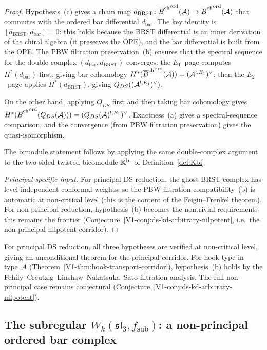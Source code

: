 \begin{proof}
Hypothesis~(c) gives a chain map
$d_{\mathrm{BRST}}\colon {\overline{B}^{\mathrm{ch}}}^{\mathrm{ord}}(\mathcal{A})
\to {\overline{B}^{\mathrm{ch}}}^{\mathrm{ord}}(\mathcal{A})$
that commutes with the ordered bar differential $d_{\mathrm{bar}}$.
The key identity is
$[d_{\mathrm{BRST}}, d_{\mathrm{bar}}] = 0$:
this holds because the BRST differential is an inner derivation of
the chiral algebra (it preserves the OPE), and the bar differential
is built from the OPE. The PBW filtration preservation~(b) ensures
that the spectral sequence for the double complex
$(d_{\mathrm{bar}}, d_{\mathrm{BRST}})$ converges: the $E_1$~page
computes $H^*(d_{\mathrm{bar}})$ first, giving bar cohomology
$H^*({\overline{B}^{\mathrm{ch}}}^{\mathrm{ord}}(\mathcal{A})) = (\mathcal{A}^{!,E_1})^\vee$; then the
$E_2$~page applies $H^*(d_{\mathrm{BRST}})$, giving
$Q_{DS}((\mathcal{A}^{!,E_1})^\vee)$.

On the other hand, applying $Q_{DS}$ first and then taking bar
cohomology gives $H^*({\overline{B}^{\mathrm{ch}}}^{\mathrm{ord}}(Q_{DS}(\mathcal{A})))
= (Q_{DS}(\mathcal{A})^{!,E_1})^\vee$. Exactness~(a) gives
a spectral-sequence comparison, and the convergence (from PBW
filtration preservation) gives the quasi-isomorphism.

The bimodule statement follows by applying the same double-complex
argument to the two-sided twisted bicomodule $\mathbb{K}^{\mathrm{bi}}$
of Definition~\ref{def:Kbi}.

\emph{Principal-specific input.}
For principal DS reduction, the ghost BRST complex has
level-independent conformal weights, so the PBW filtration
compatibility~(b) is automatic at non-critical level (this is the
content of the Feigin--Frenkel theorem). For non-principal
reduction, hypothesis~(b) becomes the nontrivial requirement;
this remains the frontier
(Conjecture~\ref*{V1-conj:ds-kd-arbitrary-nilpotent}, i.e.\ the
non-principal nilpotent corridor).
\end{proof}

\begin{remark}
\label{rem:ds-scope}
For principal DS reduction, all three hypotheses are verified
at non-critical level, giving an unconditional theorem for the
principal corridor. For hook-type in type~$A$
(Theorem~\ref*{V1-thm:hook-transport-corridor}), hypothesis~(b) holds
by the Fehily--Creutzig--Linshaw--Nakatsuka--Sato filtration analysis.
The full non-principal case
remains conjectural
(Conjecture~\ref*{V1-conj:ds-kd-arbitrary-nilpotent}).
\end{remark}
\subsection{The subregular $W_k(\mathfrak{sl}_3,f_{\mathrm{sub}})$:
a non-principal ordered bar complex}
\label{subsec:ordered-bar-subregular}

